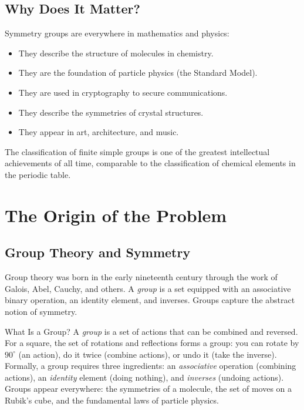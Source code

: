 \subsection{Why Does It Matter?}

Symmetry groups are everywhere in mathematics and physics:

\begin{itemize}
\item They describe the structure of molecules in chemistry.
\item They are the foundation of particle physics (the Standard Model).
\item They are used in cryptography to secure communications.
\item They describe the symmetries of crystal structures.
\item They appear in art, architecture, and music.
\end{itemize}

The classification of finite simple groups is one of the greatest intellectual achievements of all time, comparable to the classification of chemical elements in the periodic table.

\section{The Origin of the Problem}

\subsection{Group Theory and Symmetry}

Group theory was born in the early nineteenth century through the work of Galois, Abel, Cauchy, and others. A \emph{group} is a set equipped with an associative binary operation, an identity element, and inverses. Groups capture the abstract notion of symmetry.

\begin{knowledgebridge}{What Is a Group?}
A \emph{group} is a set of actions that can be combined and reversed. For a square, the set of rotations and reflections forms a group: you can rotate by $90^\circ$ (an action), do it twice (combine actions), or undo it (take the inverse). Formally, a group requires three ingredients: an \emph{associative} operation (combining actions), an \emph{identity} element (doing nothing), and \emph{inverses} (undoing actions). Groups appear everywhere: the symmetries of a molecule, the set of moves on a Rubik's cube, and the fundamental laws of particle physics.
\end{knowledgebridge}

